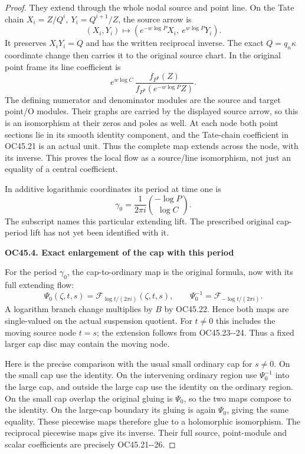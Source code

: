 \begin{proof}
They extend through the whole nodal source and point
line. On the Tate chain
\(X_i=Z/Q^i,\ Y_i=Q^{i+1}/Z\), the source arrow is
\[
 (X_i,Y_i)\mapsto
       (e^{-w\log P}X_i,\ e^{w\log P}Y_i).
 \tag{OC45.23}
\]
It preserves \(X_iY_i=Q\) and has the written reciprocal
inverse. The exact \(Q=q_n\kappa\) coordinate change
then carries it to the original source chart.
In the original point frame its line coefficient is
\[
 e^{w\log C}\,
       \frac{f_{P^8}(Z)}{f_{P^8}(e^{-w\log P}Z)}.
 \tag{OC45.24}
\]
The defining numerator and denominator modules are
the source and target point/O modules. Their graphs
are carried by the displayed source arrow, so this
is an isomorphism at their zeros and poles as well.
At each node both point sections lie in its smooth
identity component, and the Tate-chain coefficient
in OC45.21 is an actual unit. Thus the complete
map extends across the node, with its inverse.
This proves the local flow as a source/line
isomorphism, not just an equality of a central
coefficient.

In additive logarithmic coordinates its period at
time one is
\[
 \gamma_0=\frac1{2\pi i}
               \binom{-\log P}{\log C}.
 \tag{OC45.25}
\]
The subscript names this particular extending lift.
The prescribed original cap-period lift has not
yet been identified with it.

\par

\medskip\noindent\textbf{OC45.4. Exact enlargement of the cap with this period}

\par\nobreak

For the period \(\gamma_0\), the cap-to-ordinary
map is the original formula, now with its full
extending flow:
\[
 \Psi_0(\zeta,t,s)
       =\mathcal F_{\log t/(2\pi i)}(\zeta,t,s),
 \qquad
 \Psi_0^{-1}
       =\mathcal F_{-\log t/(2\pi i)}.
 \tag{OC45.26}
\]
A logarithm branch change multiplies by \(B\)
by OC45.22. Hence both maps are single-valued
on the actual suspension quotient.
For \(t\ne0\) this includes the moving source
node \(t=s\); the extension follows from
OC45.23-\/-24. Thus a fixed larger cap disc may
contain the moving node.

Here is the precise comparison with the usual
small ordinary cap for \(s\ne0\). On the
small cap use the identity. On the intervening
ordinary region use \(\Psi_0^{-1}\) into the
large cap, and outside the large cap use the
identity on the ordinary region. On the small
cap overlap the original gluing is \(\Psi_0\),
so the two maps compose to the identity.
On the large-cap boundary its gluing is
again \(\Psi_0\), giving the same equality.
These piecewise maps therefore glue to a
holomorphic isomorphism. The reciprocal
piecewise maps give its inverse. Their full
source, point-module and scalar coefficients
are precisely OC45.21-\/-26.


\end{proof}
